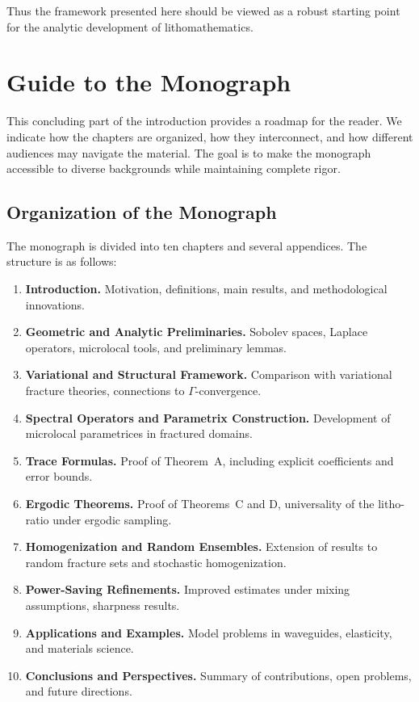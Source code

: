 Thus the framework presented here should be viewed as a robust starting point
for the analytic development of lithomathematics.


\section{Guide to the Monograph}

This concluding part of the introduction provides a roadmap for the reader.
We indicate how the chapters are organized, how they interconnect, and how
different audiences may navigate the material. The goal is to make the
monograph accessible to diverse backgrounds while maintaining complete rigor.

\subsection{Organization of the Monograph}

The monograph is divided into ten chapters and several appendices. The structure
is as follows:

\begin{enumerate}[label=Chapter~\arabic*:]
  \item \textbf{Introduction.} Motivation, definitions, main results, and
  methodological innovations.
  \item \textbf{Geometric and Analytic Preliminaries.} Sobolev spaces, Laplace
  operators, microlocal tools, and preliminary lemmas.
  \item \textbf{Variational and Structural Framework.} Comparison with
  variational fracture theories, connections to $\Gamma$-convergence.
  \item \textbf{Spectral Operators and Parametrix Construction.} Development of
  microlocal parametrices in fractured domains.
  \item \textbf{Trace Formulas.} Proof of Theorem~A, including explicit
  coefficients and error bounds.
  \item \textbf{Ergodic Theorems.} Proof of Theorems~C and D, universality of
  the litho-ratio under ergodic sampling.
  \item \textbf{Homogenization and Random Ensembles.} Extension of results to
  random fracture sets and stochastic homogenization.
  \item \textbf{Power-Saving Refinements.} Improved estimates under mixing
  assumptions, sharpness results.
  \item \textbf{Applications and Examples.} Model problems in waveguides,
  elasticity, and materials science.
  \item \textbf{Conclusions and Perspectives.} Summary of contributions, open
  problems, and future directions.
\end{enumerate}

